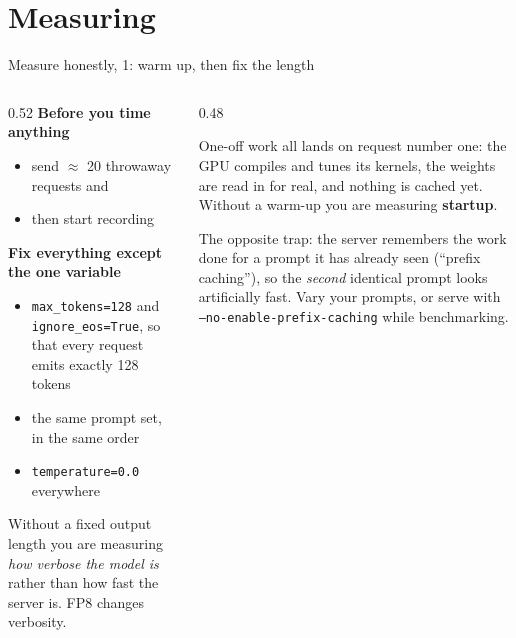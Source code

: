\documentclass[aspectratio=169,10pt]{beamer}
\begin{document}
\section{Measuring}

\fi
\begin{frame}{Measure honestly, 1: warm up, then fix the length}
  \begin{columns}[T]
    \begin{column}{0.52\textwidth}
      \textbf{Before you time anything}
      \begin{itemize}
        \item send $\approx$ 20 throwaway requests and 
        \item then start recording
      \end{itemize}
      \vspace{0.5em}
      \textbf{Fix everything except the one variable}
      \begin{itemize}
        \item \texttt{max\_tokens=128} and \texttt{ignore\_eos=True}, so that
          every request emits exactly 128 tokens
        \item the same prompt set, in the same order
        \item \texttt{temperature=0.0} everywhere
      \end{itemize}
      \vspace{0.4em}
      Without a fixed output length you are measuring \emph{how verbose the
      model is} rather than how fast the server is. FP8 changes verbosity.
    \end{column}
    \begin{column}{0.48\textwidth}
      \begin{gotcha}
        One-off work all lands on request number one: the GPU compiles and
        tunes its kernels, the weights are read in for real, and nothing is
        cached yet.
        \vspace{0.3em}
        Without a warm-up you are measuring \textbf{startup}.
      \end{gotcha}
      \vspace{0.3em}
      \small
      The opposite trap: the server remembers the work done for a prompt it has
      already seen (``prefix caching''), so the \emph{second} identical prompt
      looks artificially fast. Vary your prompts, or serve with
      \texttt{--no-enable-prefix-caching} while benchmarking.
    \end{column}
  \end{columns}
\end{frame}
\end{document}
